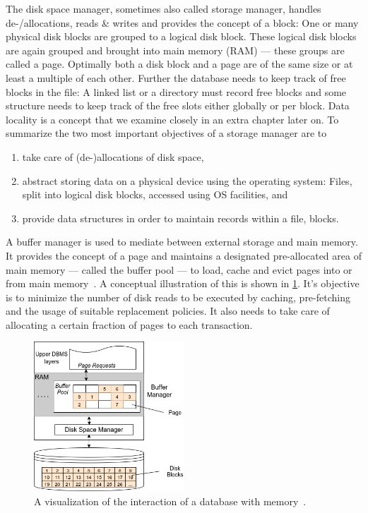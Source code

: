     The disk space manager, sometimes also called storage manager, handles de-/allocations, reads \& writes and provides the concept of a block: One or many physical disk blocks are grouped to a logical disk block.
    These logical disk blocks are again grouped and brought into main memory (RAM) --- these groups are called a page.
    Optimally both a disk block and a page are of the same size or at least a multiple of each other. 
    Further the database needs to keep track of free blocks in the file: 
    A linked list or a directory must record free blocks and some structure needs to keep track of the free slots either globally or per block. 
    Data locality is a concept that we examine closely in an extra chapter later on.
    To summarize the two most important objectives of a storage manager are to
    \begin{enumerate} 
     \item take care of (de-)allocations of disk space,
     \item abstract storing data on a physical device using the operating system: Files, split into logical disk blocks, accessed using OS facilities, and
     \item provide data structures in order to maintain records within a file, blocks.
    \end{enumerate}
    
    A buffer manager is used to mediate between external storage and main memory. 
    It provides the concept of a page and maintains a designated pre-allocated area of main memory --- called the buffer pool --- to load, cache and evict pages into or from main memory~\autocite{ramakrishnan2000database}.
    A conceptual illustration of this is shown in \ref{buf-man}.
    It's objective is to minimize the number of disk reads to be executed by caching, pre-fetching and the usage of suitable replacement policies. 
    It also needs to take care of allocating a certain fraction of pages to each transaction.

    \begin{figure}[htp]\label{dbms_memory}
        \begin{center}
        \includegraphics[keepaspectratio,height=0.4\textheight,width=0.5\textwidth]{img/03-preliminaries/RDBMS_memory_view.png}
        \end{center}
        \caption{A visualization of the interaction of a database with memory~\autocite{ramakrishnan2000database}.}
        \label{buf-man}
    \end{figure}

